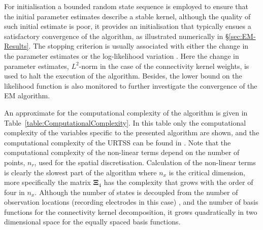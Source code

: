 \documentclass[]{article}
\begin{document}
For initialisation a bounded random state sequence is employed to ensure that the initial parameter estimates describe a stable kernel, although the quality of such initial estimate is poor, it provides an initialisation that typically ensues a satisfactory convergence of the algorithm, as illustrated numerically in \S\ref{sec:EM-Results}. The stopping criterion is usually associated with either the change in the parameter estimates or the log-likelihood variation \cite{McLachlan1997}. Here the change in parameter estimates, $L^2$-norm in the case of the connectivity kernel weights, is used to halt the execution of the algorithm. Besides, the lower bound on the likelihood function is also monitored to further investigate the convergence of the EM algorithm.  

An approximate for the computational complexity of the algorithm is given in Table~\ref{table:ComputationalComplexity}.  In this table only the computational complexity of the variables specific to the presented algorithm are shown, and the computational complexity of the URTSS can be found in \cite{Sarkka2010}. Note that the computational complexity of the non-linear terms depend on the number of points, $n_r$, used for the spatial discretisation. Calculation of the non-linear terms is clearly the slowest part of the algorithm where $n_x$ is the critical dimension, more specifically the matrix $\boldsymbol\Xi_4 $ has the complexity that grows with the order of four in $n_x$. Although the number of states  is decoupled from the number of observation locations (recording electrodes in this case) , and the number of basis functions for the connectivity kernel decomposition, it  grows quadratically in two dimensional space for the equally spaced basis functions.
\end{document}
